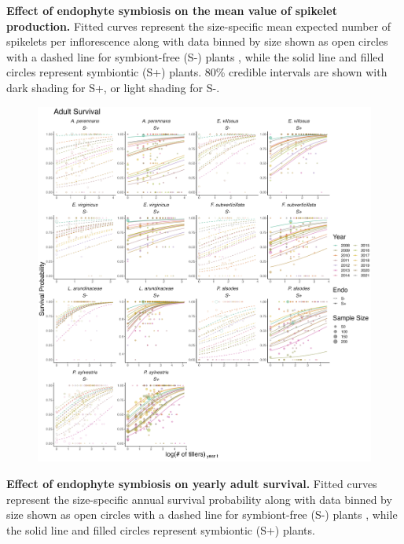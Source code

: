 \documentclass[12pt]{article}
\begin{document}
 \textbf{Effect of endophyte symbiosis on the mean value of spikelet production.} Fitted curves represent the size-specific mean expected number of spikelets per inflorescence along with data binned by size shown as open circles with a dashed line for symbiont-free (S-) plants , while the solid line and filled circles represent symbiontic (S+) plants. 80\% credible intervals are shown with dark shading for  S+, or light shading for S-.
\newpage



\begin{figure}[H]
	\centering
	\includegraphics[width=\linewidth]{surv_yearplot.png}
\end{figure}
 \textbf{Effect of endophyte symbiosis on yearly adult survival.} Fitted curves represent the size-specific annual survival probability along with data binned by size shown as open circles with a dashed line for symbiont-free (S-) plants , while the solid line and filled circles represent symbiontic (S+) plants. 
\end{document}
